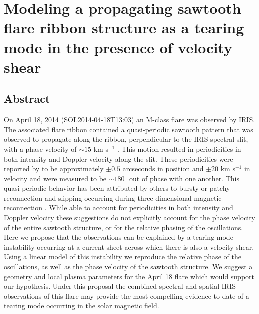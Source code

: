 

\newcommand{\curl}{\nabla \times}
\newcommand{\grad}{\nabla}
\newcommand{\pardiv}[3]{\frac{\partial^{#3} {#1}}{\partial {#2}^{#3}}}
\newcommand{\adiv}[1]{\frac{D {#1}}{Dt}}
\newcommand{\adivlong}[1]{\frac{\partial{#1}}{\partial t} + (\mathbf{u} \cdot \nabla){#1}}
\newcommand{\BLQ}{BLQ}


\newcommand{\gmodel}{.00928}
\newcommand{\Lundquistmodel}{10^4}
\newcommand{\kmodel}{.1315}
\newcommand{\posmodel}{[86,18]}



\chapter{Modeling a propagating sawtooth flare ribbon structure as a tearing mode in the presence of velocity shear}





\section{Abstract}
	On April 18, 2014 (SOL2014-04-18T13:03) an M-class flare was observed by IRIS.  The associated flare ribbon contained a quasi-periodic sawtooth pattern that was observed to propagate along the ribbon, perpendicular to the IRIS spectral slit, with a phase velocity of $\sim 15$ km s$^{-1}$ \citep{Brannon2015}.  This motion resulted in periodicities in both intensity and Doppler velocity along the slit.  These periodicities were reported by \citet{Brannon2015} to be approximately $\pm0.5$ arcseconds in position and $\pm20$ km s$^{-1}$ in velocity and were measured to be $\sim180^{\circ}$ out of phase with one another. This quasi-periodic behavior has been attributed by others to bursty or patchy reconnection \citep{Brosius2015,Brosius2016} and slipping occurring during three-dimensional magnetic reconnection \citep{Li2015,Li2016}.  While able to account for periodicities in both intensity and Doppler velocity these suggestions do not explicitly account for the phase velocity of the entire sawtooth structure, or for the relative phasing of the oscillations. Here we propose that the observations can be explained by a tearing mode instability occurring at a current sheet across which there is also a velocity shear. Using a linear model of this instability we reproduce the relative phase of the oscillations, as well as the phase velocity of the sawtooth structure.   We suggest a geometry and local plasma parameters for the April 18 flare which would support our hypothesis.  Under this proposal the combined spectral and spatial IRIS observations of this flare may provide the most compelling evidence to date of a tearing mode occurring in the solar magnetic field.


